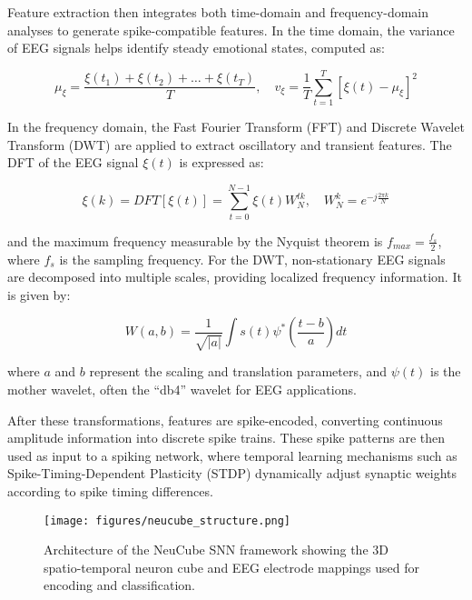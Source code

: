 \documentclass[conference]{IEEEtran}
\begin{document}
Feature extraction then integrates both time-domain and frequency-domain analyses to generate spike-compatible features. In the time domain, the variance of EEG signals helps identify steady emotional states, computed as:

\begin{equation}
\mu_{\xi} = \frac{\xi(t_1) + \xi(t_2) + \dots + \xi(t_T)}{T}, \quad
v_{\xi} = \frac{1}{T} \sum_{t=1}^{T} [\xi(t) - \mu_{\xi}]^2
\end{equation}

In the frequency domain, the Fast Fourier Transform (FFT) and Discrete Wavelet Transform (DWT) \cite{b5} are applied to extract oscillatory and transient features. The DFT of the EEG signal \( \xi(t) \) is expressed as:

\begin{equation}
\xi(k) = DFT[\xi(t)] = \sum_{t=0}^{N-1} \xi(t) W_N^{tk}, \quad W_N^k = e^{-j \frac{2\pi k}{N}}
\end{equation}

and the maximum frequency measurable by the Nyquist theorem is \( f_{max} = \frac{f_s}{2} \), where \( f_s \) is the sampling frequency.  
For the DWT, non-stationary EEG signals are decomposed into multiple scales, providing localized frequency information. It is given by:

\begin{equation}
W(a,b) = \frac{1}{\sqrt{|a|}} \int s(t) \psi^* \left( \frac{t - b}{a} \right) dt
\end{equation}

where \(a\) and \(b\) represent the scaling and translation parameters, and \(\psi(t)\) is the mother wavelet, often the “db4” wavelet for EEG applications.

After these transformations, features are spike-encoded, converting continuous amplitude information into discrete spike trains. These spike patterns are then used as input to a spiking network, where temporal learning mechanisms such as Spike-Timing-Dependent Plasticity (STDP) \cite{b5} dynamically adjust synaptic weights according to spike timing differences.

\begin{figure}[H]
    \centering
    \texttt{[image: figures/neucube\_structure.png]}
    \caption{Architecture of the NeuCube SNN framework showing the 3D spatio-temporal neuron cube and EEG electrode mappings used for encoding and classification.}
    \label{fig:neucube_structure}
\end{figure}
\end{document}
